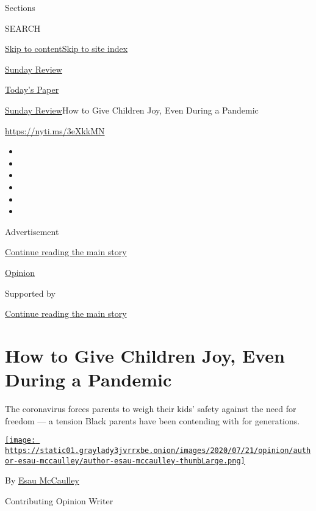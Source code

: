 Sections

SEARCH

\protect\hyperlink{site-content}{Skip to
content}\protect\hyperlink{site-index}{Skip to site index}

\href{https://www.nytimes3xbfgragh.onion/section/opinion/sunday}{Sunday
Review}

\href{https://myaccount.nytimes3xbfgragh.onion/auth/login?response_type=cookie\&client_id=vi}{}

\href{https://www.nytimes3xbfgragh.onion/section/todayspaper}{Today's
Paper}

\href{/section/opinion/sunday}{Sunday Review}\textbar{}How to Give
Children Joy, Even During a Pandemic

\url{https://nyti.ms/3eXkkMN}

\begin{itemize}
\item
\item
\item
\item
\item
\item
\end{itemize}

Advertisement

\protect\hyperlink{after-top}{Continue reading the main story}

\href{/section/opinion}{Opinion}

Supported by

\protect\hyperlink{after-sponsor}{Continue reading the main story}

\hypertarget{how-to-give-children-joy-even-during-a-pandemic}{%
\section{How to Give Children Joy, Even During a
Pandemic}\label{how-to-give-children-joy-even-during-a-pandemic}}

The coronavirus forces parents to weigh their kids' safety against the
need for freedom --- a tension Black parents have been contending with
for generations.

\href{https://www.nytimes3xbfgragh.onion/by/esau-mccaulley}{\texttt{[image: https://static01.graylady3jvrrxbe.onion/images/2020/07/21/opinion/author-esau-mccaulley/author-esau-mccaulley-thumbLarge.png]}}

By \href{https://www.nytimes3xbfgragh.onion/by/esau-mccaulley}{Esau
McCaulley}

Contributing Opinion Writer

